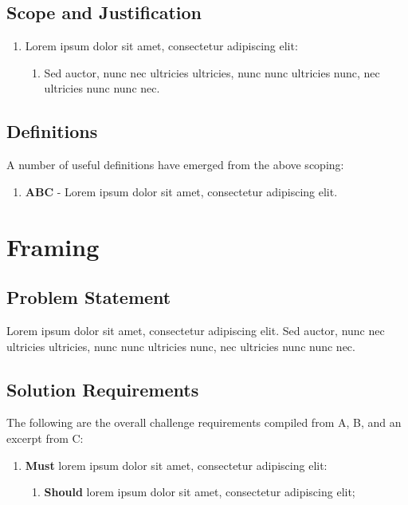 \documentclass{../../../../docs/tex/report}
\begin{document}
\clearpage


\subsection{Scope and Justification}
\label{sec:scope}

\begin{enumerate}[label=SC\arabic*., ref=SC\arabic*]
    \item \label{sc:1} Lorem ipsum dolor sit amet, consectetur adipiscing elit:
    \begin{enumerate}[label=SC3\alph*., ref=SC3\alph*]
        \item \label{sc:1a} Sed auctor, nunc nec ultricies ultricies, nunc nunc ultricies nunc, nec ultricies nunc nunc nec.
    \end{enumerate}
\end{enumerate}

\subsection{Definitions}
\label{sec:definitions}

A number of useful definitions have emerged from the above scoping:
\begin{enumerate}
    \item \textbf{ABC} - Lorem ipsum dolor sit amet, consectetur adipiscing elit.
\end{enumerate}

\clearpage


\section{Framing}
\label{sec:framing}

\subsection{Problem Statement}
\label{sec:opportunity}

Lorem ipsum dolor sit amet, consectetur adipiscing elit. Sed auctor, nunc nec ultricies ultricies, nunc nunc ultricies nunc, nec ultricies nunc nunc nec.

\subsection{Solution Requirements}
\label{sec:requirements}

The following are the overall challenge requirements compiled from A, B, and an excerpt from C:
\begin{enumerate}[label=R\arabic*., ref=R\arabic*]
    \item \label{r:1} \textbf{Must} lorem ipsum dolor sit amet, consectetur adipiscing elit:
    \begin{enumerate}[ref=R1\alph*]
        \item \label{r:1a} \textbf{Should} lorem ipsum dolor sit amet, consectetur adipiscing elit;
    \end{enumerate}
\end{enumerate}
\end{document}
